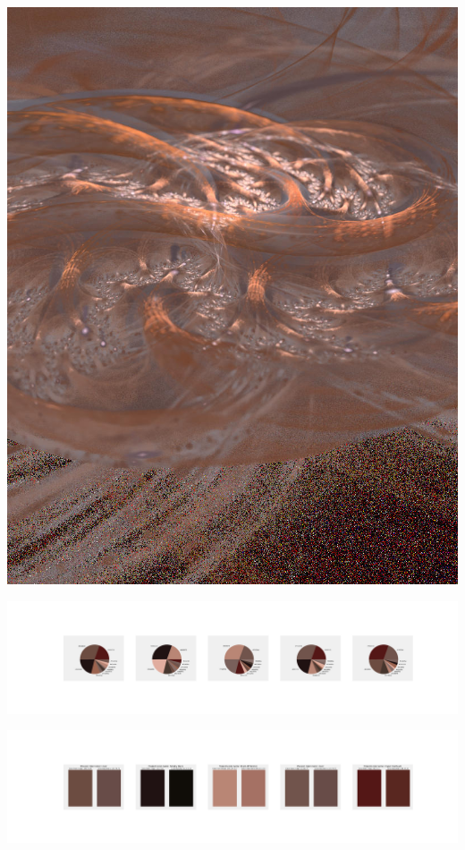 \documentclass[11pt]{article}
\begin{document}
\begin{landscape}
    \begin{center}
    \includegraphics[width=\textwidth]{./nbimg/file (19).jpg}
    \end{center}

    \begin{center}
    \includegraphics[width=250mm]{./nbimg/pie-100.jpg}
    \end{center}

    \begin{center}
    \includegraphics[width=250mm]{./nbimg/peak-100.jpg}
    \end{center}
    


\end{landscape}
\end{document}
